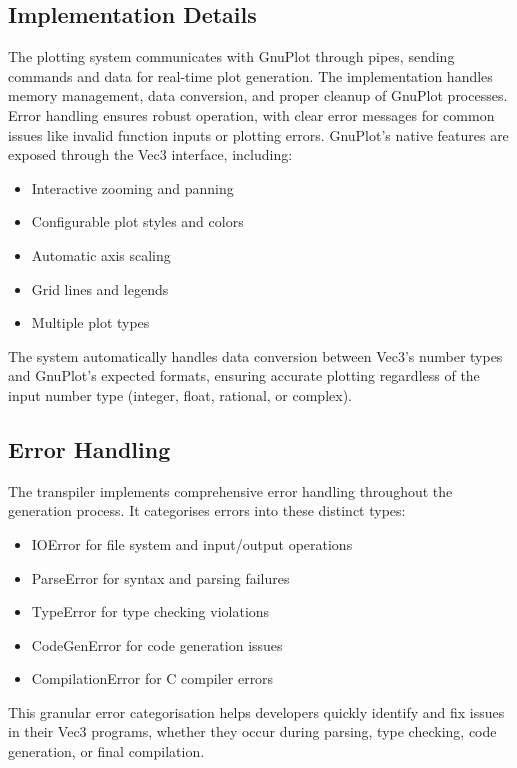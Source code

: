 \subsection{Implementation Details}\label{subsec:plotting-implementation}
The plotting system communicates with GnuPlot through pipes, sending commands and data for real-time plot generation. The implementation handles memory management, data conversion, and proper cleanup of GnuPlot processes. Error handling ensures robust operation, with clear error messages for common issues like invalid function inputs or plotting errors.
GnuPlot's native features are exposed through the Vec3 interface, including:
\begin{itemize}
    \item Interactive zooming and panning
    \item Configurable plot styles and colors
    \item Automatic axis scaling
    \item Grid lines and legends
    \item Multiple plot types
\end{itemize}
The system automatically handles data conversion between Vec3's number types and GnuPlot's expected formats, ensuring accurate plotting regardless of the input number type (integer, float, rational, or complex).

\subsection{Error Handling}\label{subsec:error-handling}

The transpiler implements comprehensive error handling throughout the generation process. 
It categorises errors into these distinct types:

\begin{itemize}[nolistsep]
\item IOError for file system and input/output operations
\item ParseError for syntax and parsing failures
\item TypeError for type checking violations
\item CodeGenError for code generation issues
\item CompilationError for C compiler errors
\end{itemize}

This granular error categorisation helps developers quickly identify and fix issues in their Vec3 programs, whether they occur during parsing, type checking, code generation, or final compilation.

